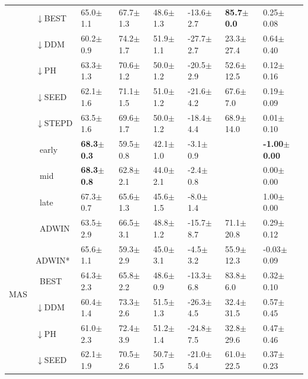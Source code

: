 \begin{tabular}{llllllll}
 & $\downarrow$BEST & 65.0\tiny{$\pm$1.1} & 67.7\tiny{$\pm$1.3} & 48.6\tiny{$\pm$1.3} & -13.6\tiny{$\pm$2.7} & \textbf{85.7\tiny{$\pm$0.0}} & 0.25\tiny{$\pm$0.08} \\
 & $\downarrow$DDM & 60.2\tiny{$\pm$0.9} & 74.2\tiny{$\pm$1.7} & 51.9\tiny{$\pm$1.1} & -27.7\tiny{$\pm$2.7} & 23.3\tiny{$\pm$27.4} & 0.64\tiny{$\pm$0.40} \\
 & $\downarrow$PH & 63.3\tiny{$\pm$1.3} & 70.6\tiny{$\pm$1.2} & 50.0\tiny{$\pm$1.2} & -20.5\tiny{$\pm$2.9} & 52.6\tiny{$\pm$12.5} & 0.12\tiny{$\pm$0.16} \\
 & $\downarrow$SEED & 62.1\tiny{$\pm$1.6} & 71.1\tiny{$\pm$1.5} & 51.0\tiny{$\pm$1.2} & -21.6\tiny{$\pm$4.2} & 67.6\tiny{$\pm$7.0} & 0.19\tiny{$\pm$0.09} \\
 & $\downarrow$STEPD & 63.5\tiny{$\pm$1.6} & 69.6\tiny{$\pm$1.7} & 50.0\tiny{$\pm$1.2} & -18.4\tiny{$\pm$4.4} & 68.9\tiny{$\pm$14.0} & 0.01\tiny{$\pm$0.10} \\
 & $\ \;$early & \textbf{68.3\tiny{$\pm$0.3}} & 59.5\tiny{$\pm$0.8} & 42.1\tiny{$\pm$1.0} & -3.1\tiny{$\pm$0.9} &  & \textbf{-1.00\tiny{$\pm$0.00}} \\
 & $\ \;$mid & \textbf{68.3\tiny{$\pm$0.8}} & 62.8\tiny{$\pm$2.1} & 44.0\tiny{$\pm$2.1} & -2.4\tiny{$\pm$0.8} &  & 0.00\tiny{$\pm$0.00} \\
 & $\ \;$late & 67.3\tiny{$\pm$0.7} & 65.6\tiny{$\pm$1.3} & 45.6\tiny{$\pm$1.5} & -8.0\tiny{$\pm$1.4} &  & 1.00\tiny{$\pm$0.00} \\
\midrule
\multirow[t]{10}{*}{MAS} & $\ \;$ADWIN & 63.5\tiny{$\pm$2.9} & 66.5\tiny{$\pm$3.1} & 48.8\tiny{$\pm$1.2} & -15.7\tiny{$\pm$8.7} & 71.1\tiny{$\pm$20.8} & 0.29\tiny{$\pm$0.12} \\
 & $\ \;$ADWIN* & 65.6\tiny{$\pm$1.1} & 59.3\tiny{$\pm$2.9} & 45.0\tiny{$\pm$3.1} & -4.5\tiny{$\pm$3.2} & 55.9\tiny{$\pm$12.3} & -0.03\tiny{$\pm$0.09} \\
 & $\ \;$BEST & 64.3\tiny{$\pm$2.3} & 65.8\tiny{$\pm$2.2} & 48.6\tiny{$\pm$0.9} & -13.3\tiny{$\pm$6.8} & 83.8\tiny{$\pm$6.0} & 0.32\tiny{$\pm$0.10} \\
 & $\downarrow$DDM & 60.4\tiny{$\pm$1.4} & 73.3\tiny{$\pm$2.6} & 51.5\tiny{$\pm$1.3} & -26.3\tiny{$\pm$4.5} & 32.4\tiny{$\pm$31.5} & 0.57\tiny{$\pm$0.45} \\
 & $\downarrow$PH & 61.0\tiny{$\pm$2.3} & 72.4\tiny{$\pm$3.9} & 51.2\tiny{$\pm$1.4} & -24.8\tiny{$\pm$7.5} & 32.8\tiny{$\pm$29.6} & 0.47\tiny{$\pm$0.46} \\
 & $\downarrow$SEED & 62.1\tiny{$\pm$1.9} & 70.5\tiny{$\pm$2.6} & 50.7\tiny{$\pm$1.5} & -21.0\tiny{$\pm$5.4} & 61.0\tiny{$\pm$22.5} & 0.37\tiny{$\pm$0.23} \\

\end{tabular}
